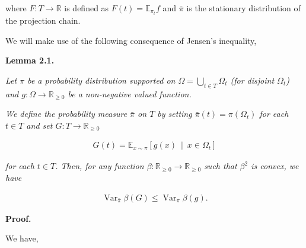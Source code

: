 where $F:T\to\mathbb{R}$ is defined as $F(t)=\mathbb{E}_{\pi_{t}}f$ and $\overline{\pi}$ is the stationary distribution of the projection chain.\par




We will make use of the following consequence of Jensen’s inequality,\par





\par\medskip\noindent\textbf{\textbf{Lemma 2.1}\textbf{.}}\par



\emph{Let $\pi$ be a probability distribution supported on $\Omega=\bigcup_{t\in T}\Omega_{t}$ (for disjoint $\Omega_{t}$) and $g:\Omega\to\mathbb{R}_{\geq 0}$ be a non-negative valued function.}\par




\emph{We define the probability measure $\bar{\pi}$ on $T$ by setting $\bar{\pi}(t)=\pi(\Omega_{t})$ for each $t\in T$ and set $G:T\to\mathbb{R}_{\geq 0}$}\par


\[\begin{gathered}
G(t)=\mathbb{E}_{x\sim\pi}\left[g(x)~\mid~x\in\Omega_{t}\right]
\end{gathered}\]


\emph{for each $t\in T$.
Then, for any function $\beta:\mathbb{R}_{\geq 0}\to\mathbb{R}_{\geq 0}$ such that $\beta^{2}$ is convex, we have}\par


\[\begin{gathered}
\operatorname{Var}_{\bar{\pi}}\beta(G)\leq\operatorname{Var}_{\pi}\beta(g).
\end{gathered}\]






\par\medskip\noindent\textbf{Proof.}\par



We have,\par


